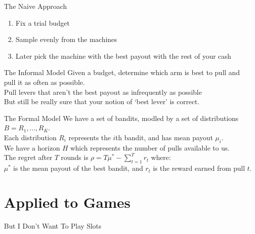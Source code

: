 \documentclass{powerdot}
\begin{document}
\begin{slide}{The Naive Approach}
  \begin{enumerate}
    \item Fix a trial budget
    \item Sample evenly from the machines
    \item Later pick the machine with the best payout with the rest of your cash
\end{enumerate}
\end{slide}

\begin{slide}{The Informal Model}
  Given a budget, determine which arm is best to pull and pull it as often as
  possible.\\ \pause
  \vspace{0.2in} Pull levers that aren't the best payout as infrequently as
  possible\\
  \vspace{0.2in}\pause
  But still be really sure that your notion of `best lever' is correct.
\end{slide}

\begin{slide}{The Formal Model}
  We have a set of bandits, modled by a set of distributions $B = {R_1, ..., R_K}$.\\\pause
  \vspace{0.2in}Each distribution $R_i$ represents the $i$th bandit, and has mean payout $\mu_i$.\\\pause
  \vspace{0.2in}We have a horizon $H$ which represents the number of pulls available to us.\\\pause
  \vspace{0.2in}The regret after $T$ rounds is $\rho = T\mu^* - \sum_{t=1}^{T}r_t$ where:\\
  $\mu^*$ is the mean payout of the best bandit, and $r_t$ is the reward earned
  from pull $t$.
\end{slide}

\section{Applied to Games}

\begin{slide}{But I Don't Want To Play Slots}
\end{slide}
\end{document}
